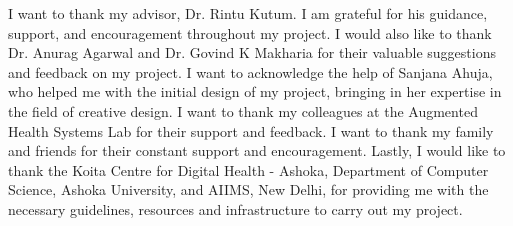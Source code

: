 I want to thank my advisor, Dr. Rintu Kutum. I am grateful for his guidance, support, and encouragement throughout my project. I would also like to thank Dr. Anurag Agarwal and Dr. Govind K Makharia for their valuable suggestions and feedback on my project. I want to acknowledge the help of Sanjana Ahuja, who helped me with the initial design of my project, bringing in her expertise in the field of creative design. I want to thank my colleagues at the Augmented Health Systems Lab for their support and feedback. I want to thank my family and friends for their constant support and encouragement. Lastly, I would like to thank the Koita Centre for Digital Health - Ashoka, Department of Computer Science, Ashoka University, and AIIMS, New Delhi, for providing me with the necessary guidelines, resources and infrastructure to carry out my project.